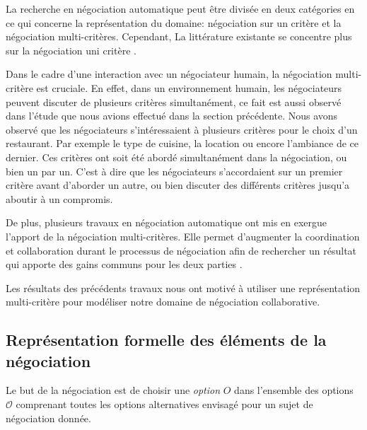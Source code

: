 
	La recherche en négociation automatique peut être divisée en deux catégories en ce qui concerne la représentation du domaine: négociation sur un critère et la négociation multi-critères. Cependant, La littérature existante se concentre plus sur la négociation uni critère \cite{lai2008decentralized,lai2004literature}. 
	
	Dans le cadre d'une interaction avec un négociateur humain, la négociation multi-critère est cruciale. En effet, dans un environnement humain, les négociateurs peuvent discuter de plusieurs critères simultanément, ce fait est aussi observé dans l'étude que nous avions effectué dans la section précédente.  Nous avons observé que les négociateurs s'intéressaient à plusieurs critères pour le choix d'un restaurant. Par exemple le type de cuisine, la location ou encore l'ambiance de ce dernier. Ces critères ont soit été abordé simultanément dans la négociation, ou bien un par un. C'est à dire que les négociateurs s'accordaient sur un premier critère avant d'aborder un autre, ou bien discuter des différents critères jusqu'a aboutir à un compromis.
	
	De plus, plusieurs travaux en négociation automatique ont mis en exergue l'apport de la négociation multi-critères. Elle permet d'augmenter la coordination et collaboration durant le processus de négociation afin de rechercher un résultat qui apporte des gains communs pour les deux parties \cite{jonker2007agent,lai2008decentralized,lai2004literature} . 


	Les résultats des précédents travaux nous ont motivé à utiliser une représentation multi-critère pour modéliser notre domaine de négociation collaborative. 
	
	\subsection{Représentation formelle des éléments de la négociation }	
	Le but de la négociation est de choisir une \textit{option} $O$ dans l'ensemble des options $\mathcal{O}$ comprenant toutes les options alternatives envisagé pour un sujet de négociation donnée. 
	
